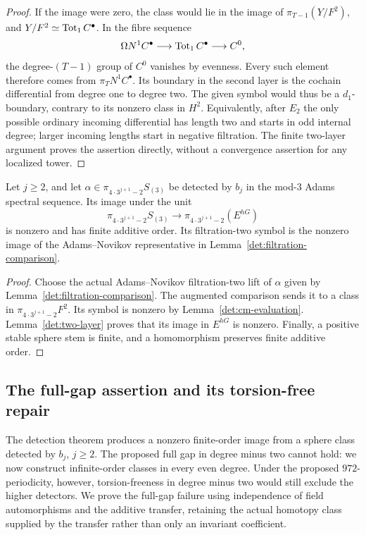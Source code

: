 \begin{proof}
If the image were zero, the class would lie in the image of
\(\pi_{T-1}(Y/F^2)\), and \(Y/F^2\simeq\operatorname{Tot}_1C^\bullet\).
In the fibre sequence
\[
 \Omega N^1C^\bullet\longrightarrow
 \operatorname{Tot}_1C^\bullet\longrightarrow C^0,
\]
the degree-\((T-1)\) group of \(C^0\) vanishes by evenness.
Every such element therefore comes from
\(\pi_T N^1C^\bullet\).
Its boundary in the second layer is the cochain differential
from degree one to degree two.  The given symbol would thus
be a \(d_1\)-boundary, contrary to its nonzero class in
\(H^2\).
Equivalently, after \(E_2\) the only possible ordinary incoming
differential has length two and starts in odd internal degree;
larger incoming lengths start in negative filtration.
The finite two-layer argument proves the assertion directly,
without a convergence assertion for any localized tower.
\end{proof}

\begin{theorem}
\label{det:actual-detector}
Let \(j\geq2\), and let
\(\alpha\in\pi_{4\cdot3^{j+1}-2}S_{(3)}\) be detected by
\(b_j\) in the mod-\(3\) Adams spectral sequence.
Its image under the unit
\[
 \pi_{4\cdot3^{j+1}-2}S_{(3)}
 \longrightarrow
 \pi_{4\cdot3^{j+1}-2}(E^{hG})
\]
is nonzero and has finite additive order.
Its filtration-two symbol is the nonzero image of the
Adams--Novikov representative in
Lemma~\ref{det:filtration-comparison}.
\end{theorem}

\begin{proof}
Choose the actual Adams--Novikov filtration-two lift of
\(\alpha\) given by Lemma~\ref{det:filtration-comparison}.
The augmented comparison sends it to a class in
\(\pi_{4\cdot3^{j+1}-2}F^2\).
Its symbol is nonzero by Lemma~\ref{det:cm-evaluation}.
Lemma~\ref{det:two-layer} proves that its image in
\(E^{hG}\) is nonzero.
Finally, a positive stable sphere stem is finite, and a
homomorphism preserves finite additive order.
\end{proof}

\subsection{The full-gap assertion and its torsion-free repair}

The detection theorem produces a nonzero finite-order image from a
sphere class detected by \(b_j\), \(j\geq2\).  The proposed full gap
in degree minus two cannot hold: we now construct infinite-order
classes in every even degree.  Under the proposed \(972\)-periodicity,
however, torsion-freeness in degree minus two would still exclude the
higher detectors.  We prove the full-gap failure using independence
of field automorphisms and the additive transfer, retaining the actual
homotopy class supplied by the transfer rather than only an invariant
coefficient.

